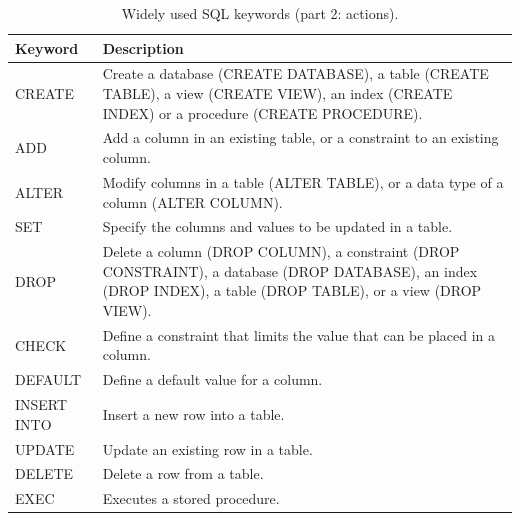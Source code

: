 \begin{table}[!htb]
	\centering \caption{Widely used SQL keywords (part 2: actions).}\label{ch:db:tab:sqlkeywords2}
	\begin{tabularx}{\textwidth}{lX}
		\hline
		Keyword & Description \\ \hline
		CREATE & Create a database (CREATE DATABASE), a table (CREATE TABLE), a view (CREATE VIEW), an index (CREATE INDEX) or a procedure (CREATE PROCEDURE). \\ 
		ADD & Add a column in an existing table, or a constraint to an existing column. \\ 
		ALTER & Modify columns in a table (ALTER TABLE), or a data type of a column (ALTER COLUMN). \\ 
		SET & Specify the columns and values to be updated in a table. \\ 
		DROP & Delete a column (DROP COLUMN), a constraint (DROP CONSTRAINT), a database (DROP DATABASE), an index (DROP INDEX), a table (DROP TABLE), or a view (DROP VIEW). \\ 
		CHECK & Define a constraint that limits the value that can be placed in a column. \\ 
		DEFAULT & Define a default value for a column. \\ 
		INSERT INTO & Insert a new row into a table. \\ 
		UPDATE & Update an existing row in a table. \\ 
		DELETE & Delete a row from a table. \\ 
		EXEC & Executes a stored procedure. \\ \hline
	\end{tabularx}
\end{table}

